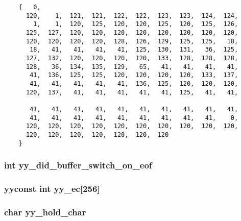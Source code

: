 \footnotesize\begin{verbatim}
    {   0,
      120,    1,  121,  121,  122,  122,  123,  123,  124,  124,
        1,    1,  120,  125,  120,  120,  125,  120,  125,  126,
      125,  127,  120,  120,  120,  120,  120,  120,  120,  120,
      120,  120,  120,  120,  128,  126,  129,  125,  125,   18,
       18,   41,   41,   41,   41,  125,  130,  131,   36,  125,
      127,  132,  120,  120,  120,  120,  133,  128,  128,  128,
      128,   36,  134,  135,  129,   65,   41,   41,   41,   41,
       41,  136,  125,  125,  120,  120,  120,  120,  133,  137,
       41,   41,   41,   41,   41,  136,  125,  120,  120,  120,
      120,  137,   41,   41,   41,   41,   41,  125,   41,   41,

       41,   41,   41,   41,   41,   41,   41,   41,   41,   41,
       41,   41,   41,   41,   41,   41,   41,   41,   41,    0,
      120,  120,  120,  120,  120,  120,  120,  120,  120,  120,
      120,  120,  120,  120,  120,  120,  120
    }\end{verbatim}\normalsize 
{}
\subsubsection{\setlength{\rightskip}{0pt plus 5cm}int yy\_\-did\_\-buffer\_\-switch\_\-on\_\-eof\hspace{0.3cm}{\tt  [static]}}\label{vcd__lexer_8c_a83}


\subsubsection{\setlength{\rightskip}{0pt plus 5cm}yyconst int yy\_\-ec[256]\hspace{0.3cm}{\tt  [static]}}\label{vcd__lexer_8c_a88}


\subsubsection{\setlength{\rightskip}{0pt plus 5cm}char yy\_\-hold\_\-char\hspace{0.3cm}{\tt  [static]}}\label{vcd__lexer_8c_a78}


